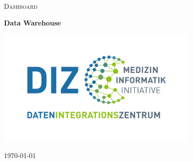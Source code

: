 \begin{titlepage}
	\thispagestyle{firstpage}
	
	\centering
	\vspace*{5cm}
	{\scshape\LARGE Dashboard\par}
	\vspace{1.5cm}
	{\huge \bfseries Data Warehouse\par}
	\vspace{2cm}
    \includegraphics[width=10cm]{figures/diz.jpg}
	\vfill
	
	{\large \today\par}
\end{titlepage}
